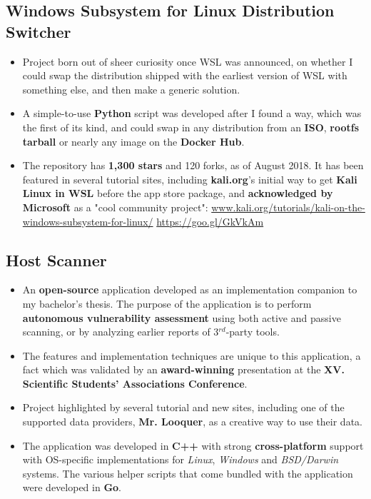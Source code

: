 \documentclass[11pt,a4paper,sans]{moderncv}
\renewcommand*{\httplink}[2][]{%
	\ifthenelse{\equal{#1}{}}%
	{\href{https://#2}{#2}}%
	{\href{https://#2}{#1}}}
\begin{document}
	\subsection{Windows Subsystem for Linux Distribution Switcher}
	
	\begin{itemize}
		\item Project born out of sheer curiosity once WSL was announced, on whether I could swap the distribution shipped with the earliest version of WSL with something else, and then make a generic solution.

		\item A simple-to-use \textbf{Python} script was developed after I found a way, which was the first of its kind, and could swap in any distribution from an \textbf{ISO}, \textbf{rootfs tarball} or nearly any image on the \textbf{Docker Hub}.

		\item The repository has \textbf{1,300 stars} and 120 forks, as of August 2018. It has been featured in several tutorial sites, including \textbf{kali.org}'s initial way to get \textbf{Kali Linux in WSL} before the app store package, and \textbf{acknowledged by Microsoft} as a "cool community project": \httplink[https://goo.gl/GkVkAm]{www.kali.org/tutorials/kali-on-the-windows-subsystem-for-linux/}
	\end{itemize}

	\subsection{Host Scanner}

	\begin{itemize}
		\item An \textbf{open-source} application developed as an implementation companion to my bachelor's thesis. The purpose of the application is to perform \textbf{autonomous vulnerability assessment} using both active and passive scanning, or by analyzing earlier reports of 3$^{rd}$-party tools.

		\item The features and implementation techniques are unique to this application, a fact which was validated by an \textbf{award-winning} presentation at the \textbf{XV. Scientific Students' Associations Conference}.

		\item Project highlighted by several tutorial and new sites, including one of the supported data providers, \textbf{Mr. Looquer}, as a creative way to use their data.

		\item The application was developed in \textbf{C++} with strong \textbf{cross-platform} support with OS-specific implementations for \textit{Linux}, \textit{Windows} and \textit{BSD/Darwin} systems. The various helper scripts that come bundled with the application were developed in \textbf{Go}.
	\end{itemize}
\end{document}
